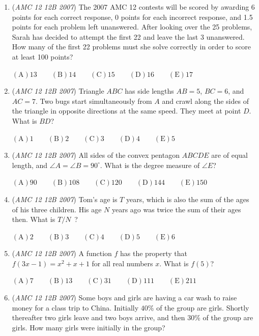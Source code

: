 \begin{enumerate}
	\item (\textit{AMC 12 12B 2007}) The 2007 AMC 12 contests will be scored by awarding 6 points for each correct response, 0 points for each incorrect response, and 1.5 points for each problem left unanswered. After looking over the 25 problems, Sarah has decided to attempt the first 22 and leave the last 3 unanswered. How many of the first 22 problems must she solve correctly in order to score at least 100 points? 


 $\mathrm {(A)} 13\qquad \mathrm {(B)} 14\qquad \mathrm {(C)} 15\qquad \mathrm {(D)} 16\qquad \mathrm {(E)} 17$


	\item (\textit{AMC 12 12B 2007}) Triangle $ABC$ has side lengths $AB = 5$, $BC = 6$, and $AC = 7$. Two bugs start simultaneously from $A$ and crawl along the sides of the triangle in opposite directions at the same speed. They meet at point $D$. What is $BD$? 


 $\mathrm {(A)} 1\qquad \mathrm {(B)} 2\qquad \mathrm {(C)} 3\qquad \mathrm {(D)} 4\qquad \mathrm {(E)} 5$


	\item (\textit{AMC 12 12B 2007}) All sides of the convex pentagon $ABCDE$ are of equal length, and $\angle A = \angle B = 90^{\circ}$. What is the degree measure of $\angle E$? 


 $\mathrm {(A)} 90\qquad \mathrm {(B)} 108\qquad \mathrm {(C)} 120\qquad \mathrm {(D)} 144\qquad \mathrm {(E)} 150$


	\item (\textit{AMC 12 12B 2007}) Tom's age is $T$ years, which is also the sum of the ages of his three children. His age $N$ years ago was twice the sum of their ages then. What is $T/N$ ? 


 $\mathrm {(A)} 2\qquad \mathrm {(B)} 3\qquad \mathrm {(C)} 4\qquad \mathrm {(D)} 5\qquad \mathrm {(E)} 6$


	\item (\textit{AMC 12 12B 2007}) A function $f$ has the property that $f(3x-1)=x^2+x+1$ for all real numbers $x$. What is $f(5)$?


 $\mathrm {(A)} 7\qquad \mathrm {(B)} 13\qquad \mathrm {(C)} 31\qquad \mathrm {(D)} 111\qquad \mathrm {(E)} 211$


	\item (\textit{AMC 12 12B 2007}) Some boys and girls are having a car wash to raise money for a class trip to China. Initially $40$\% of the group are girls. Shortly thereafter two girls leave and two boys arrive, and then $30$\% of the group are girls. How many girls were initially in the group?



\end{enumerate}
